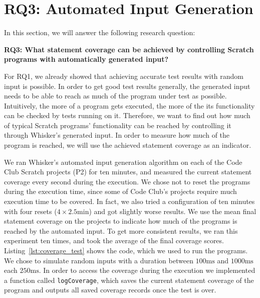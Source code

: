 \section{RQ3: Automated Input Generation}
\label{sec:rq3}

In this section, we will answer the following research question:

\begin{center}\begin{minipage}{.9\textwidth}
    \textbf{RQ3: What statement coverage can be achieved by controlling Scratch programs with automatically generated input?}
\end{minipage}\end{center}

\noindent For RQ1, we already showed that achieving accurate test results with random input is possible.
In order to get good test results generally, the generated input needs to be able to reach as much of the program under test as possible.
Intuitively, the more of a program gets executed, the more of the its functionality can be checked by tests running on it.
Therefore, we want to find out how much of typical Scratch programs' functionality can be reached by controlling it through Whisker's generated input.
In order to measure how much of the program is reached, we will use the achieved statement coverage as an indicator.
\parspace

We ran Whisker's automated input generation algorithm on each of the Code Club Scratch projects (P2) for ten minutes,
and measured the current statement coverage every second during the execution.
We chose not to reset the programs during the execution time,
since some of Code Club's projects require much execution time to be covered.
In fact, we also tried a configuration of ten minutes with four resets ($4 \times 2.5\text{min}$)
and got slightly worse results.
We use the mean final statement coverage on the projects to indicate how much of the programs is reached by the automated input.
To get more consistent results, we ran this experiment ten times, and took the average of the final coverage scores.
Listing~\ref{lst:coverage_test} shows the code, which we used to run the programs.
We chose to simulate random inputs with a duration between $100\text{ms}$ and $1000\text{ms}$ each $250\text{ms}$.
In order to access the coverage during the execution we implemented a function called \texttt{logCoverage},
which saves the current statement coverage of the program and outputs all saved coverage records once the test is over.
\parspace

